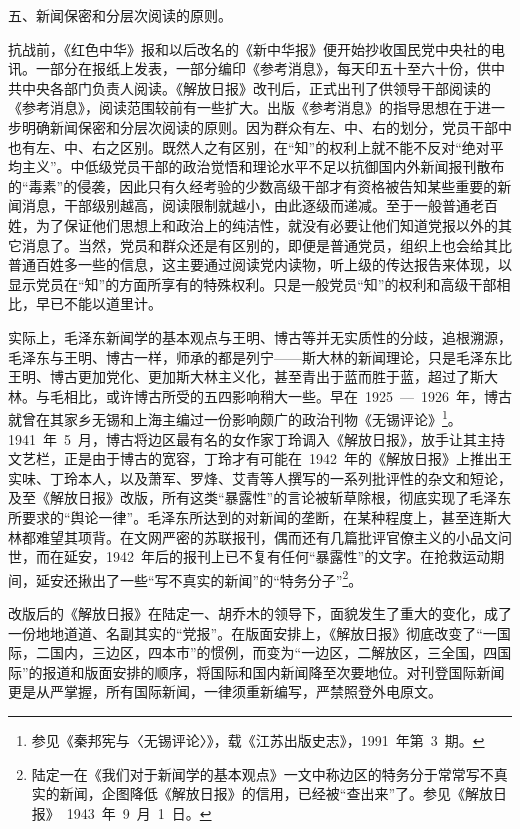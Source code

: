 五、新闻保密和分层次阅读的原则。

抗战前，《红色中华》报和以后改名的《新中华报》便开始抄收国民党中央社的电讯。一部分在报纸上发表，一部分编印《参考消息》，每天印五十至六十份，供中共中央各部门负责人阅读。《解放日报》改刊后，正式出刊了供领导干部阅读的《参考消息》，阅读范围较前有一些扩大。出版《参考消息》的指导思想在于进一步明确新闻保密和分层次阅读的原则。因为群众有左、中、右的划分，党员干部中也有左、中、右之区别。既然人之有区别，在“知”的权利上就不能不反对“绝对平均主义”。中低级党员干部的政治觉悟和理论水平不足以抗御国内外新闻报刊散布的“毒素”的侵袭，因此只有久经考验的少数高级干部才有资格被告知某些重要的新闻消息，干部级别越高，阅读限制就越小，由此逐级而递减。至于一般普通老百姓，为了保证他们思想上和政治上的纯洁性，就没有必要让他们知道党报以外的其它消息了。当然，党员和群众还是有区别的，即便是普通党员，组织上也会给其比普通百姓多一些的信息，这主要通过阅读党内读物，听上级的传达报告来体现，以显示党员在“知”的方面所享有的特殊权利。只是一般党员“知”的权利和高级干部相比，早已不能以道里计。

实际上，毛泽东新闻学的基本观点与王明、博古等并无实质性的分歧，追根溯源，毛泽东与王明、博古一样，师承的都是列宁——斯大林的新闻理论，只是毛泽东比王明、博古更加党化、更加斯大林主义化，甚至青出于蓝而胜于蓝，超过了斯大林。与毛相比，或许博古所受的五四影响稍大一些。早在~1925~—~1926~年，博古就曾在其家乡无锡和上海主编过一份影响颇广的政治刊物《无锡评论》\footnote{参见《秦邦宪与〈无锡评论〉》，载《江苏出版史志》，1991~年第~3~期。}。1941~年~5~月，博古将边区最有名的女作家丁玲调入《解放日报》，放手让其主持文艺栏，正是由于博古的宽容，丁玲才有可能在~1942~年的《解放日报》上推出王实味、丁玲本人，以及萧军、罗烽、艾青等人撰写的一系列批评性的杂文和短论，及至《解放日报》改版，所有这类“暴露性”的言论被斩草除根，彻底实现了毛泽东所要求的“舆论一律”。毛泽东所达到的对新闻的垄断，在某种程度上，甚至连斯大林都难望其项背。在文网严密的苏联报刊，偶而还有几篇批评官僚主义的小品文问世，而在延安，1942~年后的报刊上已不复有任何“暴露性”的文字。在抢救运动期间，延安还揪出了一些“写不真实的新闻”的“特务分子”\footnote{陆定一在《我们对于新闻学的基本观点》一文中称边区的特务分于常常写不真实的新闻，企图降低《解放日报》的信用，已经被“查出来”了。参见《解放日报》~1943~年~9~月~1~日。}。

改版后的《解放日报》在陆定一、胡乔木的领导下，面貌发生了重大的变化，成了一份地地道道、名副其实的“党报”。在版面安排上，《解放日报》彻底改变了“一国际，二国内，三边区，四本市”的惯例，而变为“一边区，二解放区，三全国，四国际”的报道和版面安排的顺序，将国际和国内新闻降至次要地位。对刊登国际新闻更是从严掌握，所有国际新闻，一律须重新编写，严禁照登外电原文。

